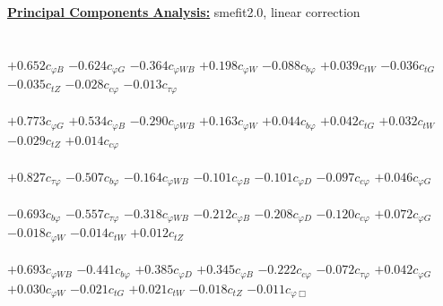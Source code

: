\documentclass{article}
\begin{document}
\noindent \underline{\bf{Principal Components Analysis}:} smefit2.0, linear correction\\ \\ \\
{$+0.652$}{\rm $c_{\varphi B}$} 
{$-0.624$}{\rm $c_{\varphi G}$} 
{$-0.364$}{\rm $c_{\varphi WB}$} 
{$+0.198$}{\rm $c_{\varphi W}$} 
{$-0.088$}{\rm $c_{b \varphi}$} 
{$+0.039$}{\rm $c_{tW}$} 
{$-0.036$}{\rm $c_{tG}$} 
{$-0.035$}{\rm $c_{tZ}$} 
{$-0.028$}{\rm $c_{c \varphi}$} 
{$-0.013$}{\rm $c_{\tau \varphi}$} 
 \nonumber \\ \nonumber \\ 
{$+0.773$}{\rm $c_{\varphi G}$} 
{$+0.534$}{\rm $c_{\varphi B}$} 
{$-0.290$}{\rm $c_{\varphi WB}$} 
{$+0.163$}{\rm $c_{\varphi W}$} 
{$+0.044$}{\rm $c_{b \varphi}$} 
{$+0.042$}{\rm $c_{tG}$} 
{$+0.032$}{\rm $c_{tW}$} 
{$-0.029$}{\rm $c_{tZ}$} 
{$+0.014$}{\rm $c_{c \varphi}$} 
 \nonumber \\ \nonumber \\ 
{$+0.827$}{\rm $c_{\tau \varphi}$} 
{$-0.507$}{\rm $c_{b \varphi}$} 
{$-0.164$}{\rm $c_{\varphi WB}$} 
{$-0.101$}{\rm $c_{\varphi B}$} 
{$-0.101$}{\rm $c_{\varphi D}$} 
{$-0.097$}{\rm $c_{c \varphi}$} 
{$+0.046$}{\rm $c_{\varphi G}$} 
 \nonumber \\ \nonumber \\ 
{$-0.693$}{\rm $c_{b \varphi}$} 
{$-0.557$}{\rm $c_{\tau \varphi}$} 
{$-0.318$}{\rm $c_{\varphi WB}$} 
{$-0.212$}{\rm $c_{\varphi B}$} 
{$-0.208$}{\rm $c_{\varphi D}$} 
{$-0.120$}{\rm $c_{c \varphi}$} 
{$+0.072$}{\rm $c_{\varphi G}$} 
{$-0.018$}{\rm $c_{\varphi W}$} 
{$-0.014$}{\rm $c_{tW}$} 
{$+0.012$}{\rm $c_{tZ}$} 
 \nonumber \\ \nonumber \\ 
{$+0.693$}{\rm $c_{\varphi WB}$} 
{$-0.441$}{\rm $c_{b \varphi}$} 
{$+0.385$}{\rm $c_{\varphi D}$} 
{$+0.345$}{\rm $c_{\varphi B}$} 
{$-0.222$}{\rm $c_{c \varphi}$} 
{$-0.072$}{\rm $c_{\tau \varphi}$} 
{$+0.042$}{\rm $c_{\varphi G}$} 
{$+0.030$}{\rm $c_{\varphi W}$} 
{$-0.021$}{\rm $c_{tG}$} 
{$+0.021$}{\rm $c_{tW}$} 
{$-0.018$}{\rm $c_{tZ}$} 
{$-0.011$}{\rm $c_{\varphi \Box}$} 
 \nonumber \\ \nonumber \\ 
\end{document}
